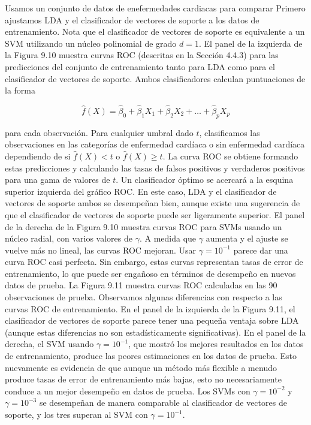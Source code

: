 \begin{example}
Usamos un conjunto de datos de enefermedades cardiacas para comparar 
Primero ajustamos LDA y el clasificador de vectores de soporte a los datos de entrenamiento.
Nota que el clasificador de vectores de soporte es equivalente a un SVM utilizando un núcleo polinomial de grado $d = 1$.
El panel de la izquierda de la Figura 9.10 muestra curvas ROC (descritas en la Sección 4.4.3) para las predicciones del conjunto de entrenamiento tanto para LDA como para el clasificador de vectores de soporte.
Ambos clasificadores calculan puntuaciones de la forma

\begin{equation}
\hat{f}(X) = \hat{\beta}_0 + \hat{\beta}_1 X_1 + \hat{\beta}_2 X_2 + \dots + \hat{\beta}_p X_p
\end{equation}

para cada observación.
Para cualquier umbral dado $t$, clasificamos las observaciones en las categorías de enfermedad cardíaca o sin enfermedad cardíaca dependiendo de si $\hat{f}(X) < t$ o $\hat{f}(X) \geq t$.
La curva ROC se obtiene formando estas predicciones y calculando las tasas de falsos positivos y verdaderos positivos para una gama de valores de $t$.
Un clasificador óptimo se acercará a la esquina superior izquierda del gráfico ROC.
En este caso, LDA y el clasificador de vectores de soporte ambos se desempeñan bien, aunque existe una sugerencia de que el clasificador de vectores de soporte puede ser ligeramente superior.
El panel de la derecha de la Figura 9.10 muestra curvas ROC para SVMs usando un núcleo radial, con varios valores de $\gamma$.
A medida que $\gamma$ aumenta y el ajuste se vuelve más no lineal, las curvas ROC mejoran.
Usar $\gamma = 10^{-1}$ parece dar una curva ROC casi perfecta.
Sin embargo, estas curvas representan tasas de error de entrenamiento, lo que puede ser engañoso en términos de desempeño en nuevos datos de prueba.
La Figura 9.11 muestra curvas ROC calculadas en las 90 observaciones de prueba.
Observamos algunas diferencias con respecto a las curvas ROC de entrenamiento.
En el panel de la izquierda de la Figura 9.11, el clasificador de vectores de soporte parece tener una pequeña ventaja sobre LDA (aunque estas diferencias no son estadísticamente significativas).
En el panel de la derecha, el SVM usando $\gamma = 10^{-1}$, que mostró los mejores resultados en los datos de entrenamiento, produce las peores estimaciones en los datos de prueba.
Esto nuevamente es evidencia de que aunque un método más flexible a menudo produce tasas de error de entrenamiento más bajas, esto no necesariamente conduce a un mejor desempeño en datos de prueba.
Los SVMs con $\gamma = 10^{-2}$ y $\gamma = 10^{-3}$ se desempeñan de manera comparable al clasificador de vectores de soporte, y los tres superan al SVM con $\gamma = 10^{-1}$.
\end{example}






